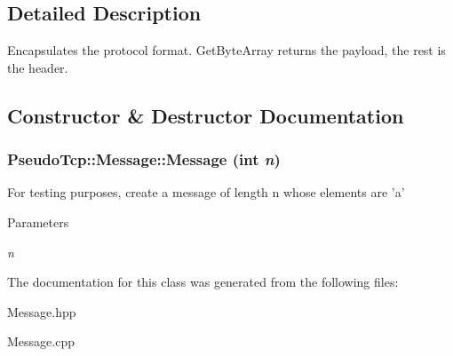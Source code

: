\subsection{Detailed Description}
Encapsulates the protocol format. GetByteArray returns the payload, the rest is the header. 

\subsection{Constructor \& Destructor Documentation}
\hypertarget{classPseudoTcp_1_1Message_a9adbafc6e615e070f8e0ef861a507421}{
\subsubsection[{Message}]{\setlength{\rightskip}{0pt plus 5cm}PseudoTcp::Message::Message (int {\em n})}}
\label{classPseudoTcp_1_1Message_a9adbafc6e615e070f8e0ef861a507421}
For testing purposes, create a message of length n whose elements are 'a' 
\begin{DoxyParams}{Parameters}
\item[{\em n}]\end{DoxyParams}


The documentation for this class was generated from the following files:\begin{DoxyCompactItemize}
\item 
Message.hpp\item 
Message.cpp\end{DoxyCompactItemize}
